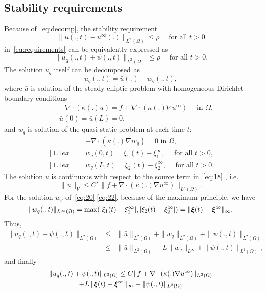 \subsection{Stability requirements}
%
Because of~\eqref{eq:decomp}, the stability requirement
\begin{equation}
\| u(.,t)-u^{\infty}(.)\|_{L^2(\Omega)} \leq \rho \quad \mbox{ for all } t>0
\label{eq:stab1}
\end{equation}
in~\eqref{eq:requirements} can be equivalently expressed as
\[
\|u_q(.,t) + \psi(.,t)\|_{L^2(\Omega)} \leq \rho \quad \mbox{ for all } t>0.
\]
The solution $u_q$ itself can be decomposed as
\[
u_q(.,t) = \bar u(.) + w_q(.,t),
\]
where $\bar u$ is solution of the steady elliptic problem with homogeneous Dirichlet boundary conditions
\begin{eqnarray}
&& -\nabla\cdot(\kappa(.)\bar u) = 
f+\nabla\cdot(\kappa(.)\nabla u^\infty) \quad \mbox{ in } \Omega, \label{eq:18}\\
&& \bar u(0) = \bar u(L) = 0, \label{eq:19}
\end{eqnarray}
%
and $w_q$ is solution of the quasi-static problem at each time $t$:
%
\begin{eqnarray}
&&  - \nabla\cdot(\kappa(.)\nabla w_q) = 0 \mbox{ in } \Omega, 
\label{eq:20}\\ [1.1ex]
&& w_q(0,t) = \xi_1(t)-\xi_1^\infty, \quad \mbox{ for all } t>0, \\ [1.1ex]
&& w_q(L,t) = \xi_2(t)-\xi_2^\infty, \quad \mbox{ for all } t>0.
\label{eq:22}
\end{eqnarray}
%
The solution $\bar u$ is continuous with respect to the source term in~\eqref{eq:18} \cite{???}, i.e.
%
\begin{equation}
\|\bar u\|_V \leq C'\, \|f+\nabla\cdot(\kappa(.)\nabla u^\infty)\|_{L^2(\Omega)}.
\end{equation}
%
For the solution $w_q$ of~\eqref{eq:20}-\eqref{eq:22}, because of the maximum
principle, we have
%
\begin{equation}
\|w_q(.,t)\|_{L^\infty(\Omega)} = \max(|\xi_1(t)-\xi_1^\infty|,|\xi_2(t)-\xi_2^\infty|)
=\|\bm{\xi}(t)-\bm{\xi}^\infty\|_\infty.
\end{equation}
%
Thus, 
\begin{eqnarray*}
\|u_q(.,t)+\psi(.,t)\|_{L^2(\Omega)}&\leq& \|\bar u\|_{L^2(\Omega)} + \|w_q\|_{L^2(\Omega)} + \|\psi(.,t)\|_{L^2(\Omega)} \\
&\leq & \|\bar u\|_{L^2(\Omega)} + L \|w_q\|_{L^\infty}+ \|\psi(.,t)\|_{L^2(\Omega)}, 
\end{eqnarray*}
and finally
\begin{multline*}
\|u_q(.,t)+\psi(.,t)\|_{L^2(\Omega)} \leq  C \|f+\nabla\cdot(\kappa(.)\nabla u^\infty)\|_{L^2(\Omega)} \\ + L\,\|\bm{\xi}(t)-\bm{\xi}^\infty\|_\infty + \|\psi(.,t)\|_{L^2(\Omega)}
\end{multline*}


